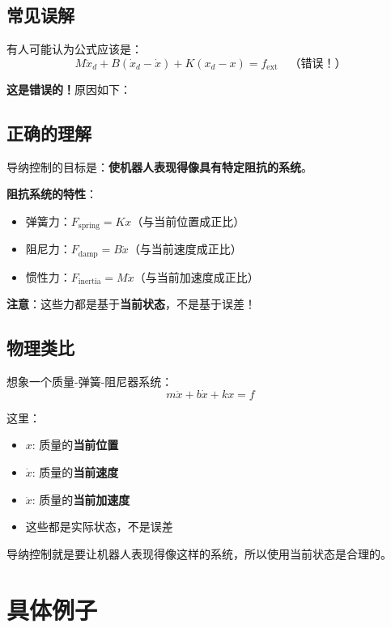 \documentclass[12pt,a4paper]{article}
\begin{document}
\subsection{常见误解}

有人可能认为公式应该是：
\begin{equation}
M\ddot{x}_d + B(\dot{x}_d - \dot{x}) + K(x_d - x) = f_{\text{ext}} \quad \text{（错误！）}
\end{equation}

\textbf{这是错误的！}原因如下：

\subsection{正确的理解}

导纳控制的目标是：\textbf{使机器人表现得像具有特定阻抗的系统}。

\textbf{阻抗系统的特性}：
\begin{itemize}
\item 弹簧力：$F_{\text{spring}} = Kx$（与当前位置成正比）
\item 阻尼力：$F_{\text{damp}} = B\dot{x}$（与当前速度成正比）
\item 惯性力：$F_{\text{inertia}} = M\ddot{x}$（与当前加速度成正比）
\end{itemize}

\textbf{注意}：这些力都是基于\textbf{当前状态}，不是基于误差！

\subsection{物理类比}

想象一个质量-弹簧-阻尼器系统：
\begin{equation}
m\ddot{x} + b\dot{x} + kx = f
\end{equation}

这里：
\begin{itemize}
\item $x$: 质量的\textbf{当前位置}
\item $\dot{x}$: 质量的\textbf{当前速度}
\item $\ddot{x}$: 质量的\textbf{当前加速度}
\item 这些都是实际状态，不是误差
\end{itemize}

导纳控制就是要让机器人表现得像这样的系统，所以使用当前状态是合理的。

\section{具体例子}
\end{document}
